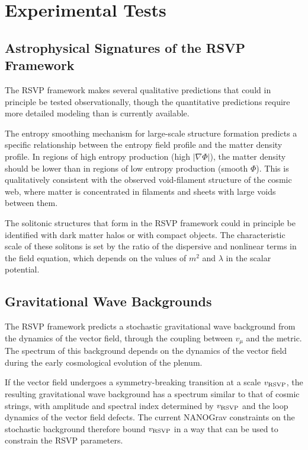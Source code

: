 \documentclass[12pt,a4paper,oneside]{book}
\theoremstyle{definition}
\theoremstyle{plain}
\theoremstyle{remark}
\begin{document}
\chapter{Experimental Tests}

\section{Astrophysical Signatures of the RSVP Framework}

The RSVP framework makes several qualitative predictions that could in
principle be tested observationally, though the quantitative predictions
require more detailed modeling than is currently available.

The entropy smoothing mechanism for large-scale structure formation
predicts a specific relationship between the entropy field profile and
the matter density profile. In regions of high entropy production
(high $|\nabla\Phi|$), the matter density should be lower than in
regions of low entropy production (smooth $\Phi$). This is qualitatively
consistent with the observed void-filament structure of the cosmic web,
where matter is concentrated in filaments and sheets with large voids
between them.

The solitonic structures that form in the RSVP framework could in
principle be identified with dark matter halos or with compact objects.
The characteristic scale of these solitons is set by the ratio of the
dispersive and nonlinear terms in the field equation, which depends on
the values of $m^2$ and $\lambda$ in the scalar potential.

\section{Gravitational Wave Backgrounds}

The RSVP framework predicts a stochastic gravitational wave background from
the dynamics of the vector field, through the coupling between $v_\mu$ and
the metric. The spectrum of this background depends on the dynamics of the
vector field during the early cosmological evolution of the plenum.

If the vector field undergoes a symmetry-breaking transition at a scale
$v_{\rm RSVP}$, the resulting gravitational wave background has a spectrum
similar to that of cosmic strings, with amplitude and spectral index
determined by $v_{\rm RSVP}$ and the loop dynamics of the vector field
defects. The current NANOGrav constraints on the stochastic background
therefore bound $v_{\rm RSVP}$ in a way that can be used to constrain the
RSVP parameters.
\end{document}
